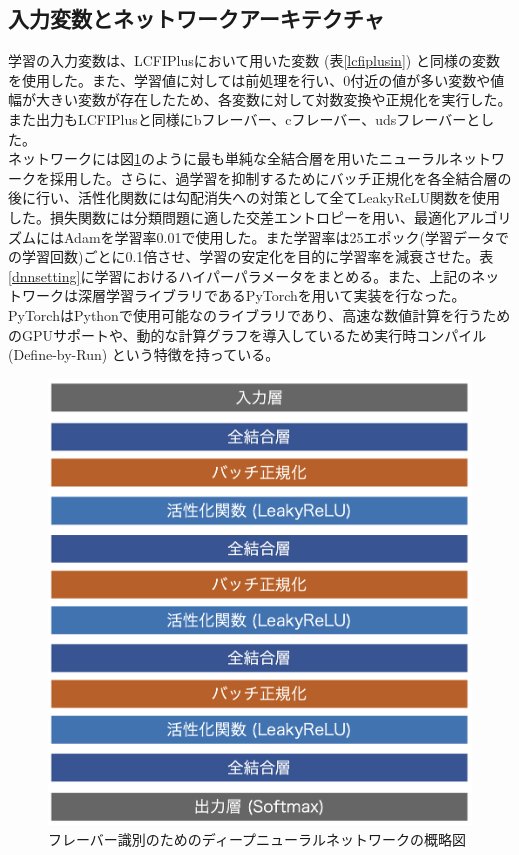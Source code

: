 \subsection{入力変数とネットワークアーキテクチャ}
学習の入力変数は、LCFIPlusにおいて用いた変数 (表\ref{lcfiplusin}) と同様の変数を使用した。また、学習値に対しては前処理を行い、0付近の値が多い変数や値幅が大きい変数が存在したため、各変数に対して対数変換や正規化を実行した。また出力もLCFIPlusと同様にbフレーバー、cフレーバー、udsフレーバーとした。\\
ネットワークには図\ref{dnnmodel}のように最も単純な全結合層を用いたニューラルネットワークを採用した。さらに、過学習を抑制するためにバッチ正規化を各全結合層の後に行い、活性化関数には勾配消失への対策として全てLeakyReLU関数を使用した。損失関数には分類問題に適した交差エントロピーを用い、最適化アルゴリズムにはAdamを学習率0.01で使用した。また学習率は25エポック(学習データでの学習回数)ごとに0.1倍させ、学習の安定化を目的に学習率を減衰させた。表\ref{dnnsetting}に学習におけるハイパーパラメータをまとめる。また、上記のネットワークは深層学習ライブラリであるPyTorchを用いて実装を行なった。PyTorchはPythonで使用可能なのライブラリであり、高速な数値計算を行うためのGPUサポートや、動的な計算グラフを導入しているため実行時コンパイル (Define-by-Run) という特徴を持っている。
\begin{figure}[H]
	\begin{center}
 \includegraphics[keepaspectratio, scale=0.5]
 	{Figure/Flavortagging/dnn.png}
 		\caption{フレーバー識別のためのディープニューラルネットワークの概略図}
 		\label{dnnmodel}
	\end{center}
\end{figure}
